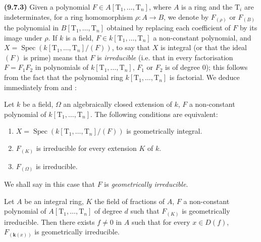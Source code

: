 \textbf{(9.7.3)}
\label{IV.9.7.3}
Given a polynomial $F\in A[\mathrm{T}_1,\ldots,\mathrm{T}_n]$, where $A$ is a ring and the $\mathrm{T}_i$ are indeterminates, for a ring homomorphism $\rho:A\to B$, we denote by $F_{(\rho)}$ or $F_{(B)}$ the polynomial in $B[\mathrm{T}_1,\ldots,\mathrm{T}_n]$ obtained by replacing each coefficient of $F$ by its image under $\rho$.
If $k$ is a field, $F\in k[\mathrm{T}_1,\ldots,\mathrm{T}_n]$ a non-constant polynomial, and $X=\operatorname{Spec}(k[\mathrm{T}_1,\ldots,\mathrm{T}_n]/(F))$, to say that $X$ is integral (or that the ideal $(F)$ is prime) means that $F$ is \emph{irreducible} (i.e. that in every factorisation $F=F_1 F_2$ in polynomials of $k[\mathrm{T}_1,\ldots,\mathrm{T}_n]$, $F_1$ or $F_2$ is of degree $0$); this follows from the fact that the polynomial ring $k[\mathrm{T}_1,\ldots,\mathrm{T}_n]$ is factorial.
We deduce immediately from  and :

\begin{lemma}[9.7.4]
\label{IV.9.7.4}
Let $k$ be a field, $\Omega$ an algebraically closed extension of $k$, $F$ a non-constant polynomial of $k[\mathrm{T}_1,\ldots,\mathrm{T}_n]$.
The following conditions are equivalent:
\begin{enumerate}[label=\emph{\alph*)}]
  \item $X=\operatorname{Spec}(k[\mathrm{T}_1,\ldots,\mathrm{T}_n]/(F))$ is geometrically integral.
  \item $F_{(K)}$ is irreducible for every extension $K$ of $k$.
  \item $F_{(\Omega)}$ is irreducible.
\end{enumerate}
We shall say in this case that $F$ is \emph{geometrically irreducible}.
\end{lemma}

\begin{lemma}[9.7.5]
\label{IV.9.7.5}
Let $A$ be an integral ring, $K$ the field of fractions of $A$, $F$ a non-constant polynomial of $A[\mathrm{T}_1,\ldots,\mathrm{T}_n]$ of degree $d$ such that $F_{(K)}$ is geometrically irreducible.
Then there exists $f\neq 0$ in $A$ such that for every $x\in D(f)$, $F_{(\boldsymbol{k}(x))}$ is geometrically irreducible.
\end{lemma}

